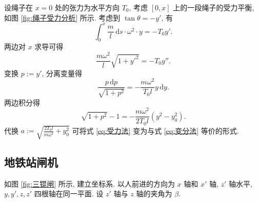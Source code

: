 \documentclass{article}
\begin{document}
设绳子在 $x=0$ 处的张力为水平方向 $T_0$,
考虑 $\left[0,x\right]$ 上的一段绳子的受力平衡, 如图 \ref{fig:绳子受力分析} 所示.
考虑到 $\tan\theta=-y'$, 有
\begin{equation}
	\int_0^x\frac ml\,\mathrm ds\cdot\omega^2\cdot y=-T_0y'.
\end{equation}
两边对 $x$ 求导可得
\begin{equation}
	\frac{m\omega^2}{l}\sqrt{1+y'^2}=-T_0y''.
\end{equation}
变换 $p:=y'$, 分离变量得
\begin{equation}
	\frac{p\,\mathrm dp}{\sqrt{1+p^2}}=-\frac{m\omega^2}{T_0l}y\,\mathrm dy.
\end{equation}
两边积分得
\begin{equation}
	\sqrt{1+p^2}-1=-\frac{m\omega^2}{2T_0l}\left(y^2-y_0^2\right).
	\label{eq:受力法}
\end{equation}
代换 $a:=\sqrt{\frac{2T_0l}{m\omega^2}+y_0^2}$ 可将式 \ref{eq:受力法} 变为与式 \ref{eq:变分法} 等价的形式.

\subsection{地铁站闸机}

如图 \ref{fig:三锟闸} 所示, 建立坐标系.
以人前进的方向为 $x$ 轴和 $x'$ 轴, $z'$ 轴水平, $y,y',z,z'$ 四根轴在同一平面.
设 $z'$ 轴与 $z$ 轴的夹角为 $\beta$.
\end{document}
